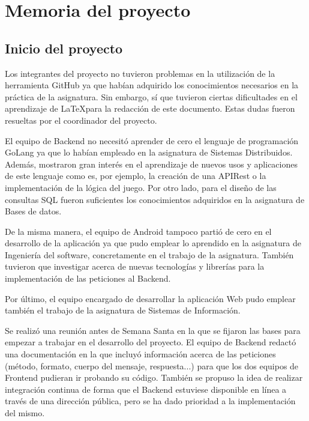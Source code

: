 \documentclass{article}
\begin{document}


\section{Memoria del proyecto}

\subsection{Inicio del proyecto}
Los integrantes del proyecto no tuvieron problemas en la utilización de la herramienta GitHub ya que habían adquirido los conocimientos necesarios en la práctica de la asignatura. Sin embargo, sí que tuvieron ciertas dificultades en el aprendizaje de \LaTeX para la redacción de este documento. Estas dudas fueron resueltas por el coordinador del proyecto.

El equipo de Backend no necesitó aprender de cero el lenguaje de programación GoLang ya que lo habían empleado en la asignatura de Sistemas Distribuidos. Además, mostraron gran interés en el aprendizaje de nuevos usos y aplicaciones de este lenguaje como es, por ejemplo, la creación de una APIRest o la implementación de la lógica del juego. Por otro lado, para el diseño de las consultas SQL fueron suficientes los conocimientos adquiridos en la asignatura de Bases de datos.

De la misma manera, el equipo de Android tampoco partió de cero en el desarrollo de la aplicación ya que pudo emplear lo aprendido en la asignatura de Ingeniería del software, concretamente en el trabajo de la asignatura. También tuvieron que investigar acerca de nuevas tecnologías y librerías para la implementación de las peticiones al Backend.

Por último, el equipo encargado de desarrollar la aplicación Web pudo emplear también el trabajo de la asignatura de Sistemas de Información.

Se realizó una reunión antes de Semana Santa en la que se fijaron las bases para empezar a trabajar en el desarrollo del proyecto. El equipo de Backend redactó una documentación en la que incluyó información acerca de las peticiones (método, formato, cuerpo del mensaje, respuesta...) para que los dos equipos de Frontend pudieran ir probando su código. También se propuso la idea de realizar integración continua de forma que el Backend estuviese disponible en línea a través de una dirección pública, pero se ha dado prioridad a la implementación del mismo. 
\end{document}
